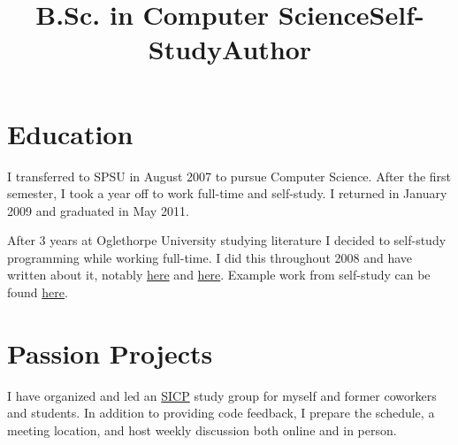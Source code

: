 \documentclass[margintitle,line]{res}
\renewcommand{\subsection}[1]{\section{\normalfont #1}}
\begin{document}
\begin{resume}

\section{Education}

\title{B.Sc. in Computer Science}
\begin{position}
  I transferred to SPSU in August 2007 to pursue Computer Science.
  After the first semester, I took a year off to work full-time and self-study.
  I returned in January 2009 and graduated in May 2011.
\end{position}

\title{Self-Study}
\begin{position}
  After 3 years at Oglethorpe University studying literature
  I decided to self-study programming while working full-time.
  I did this throughout 2008 and have written about it, notably
  \href{https://blog.kingcons.io/posts/Leaving-College-to-Leverage-Compulsion.html}{here}
  and
  \href{https://blog.kingcons.io/posts/Spring-2008-Schedule-and-Syllabus.html}{here}.
  Example work from self-study can be found
  \href{https://blog.kingcons.io/posts/SICP-Section-13.html}{here}.
\end{position}


\pagebreak

\setlength{\parskip}{1ex}


\subsection{Passion Projects}

\title{Author}
\begin{position}
  I have organized and led an \href{https://sarabander.github.io/sicp/}{SICP} study group for
  myself and former coworkers and students. In addition to providing code feedback,
  I prepare the schedule, a meeting location, and host weekly discussion both online and in person.
\end{position}


\end{resume}
\end{document}
